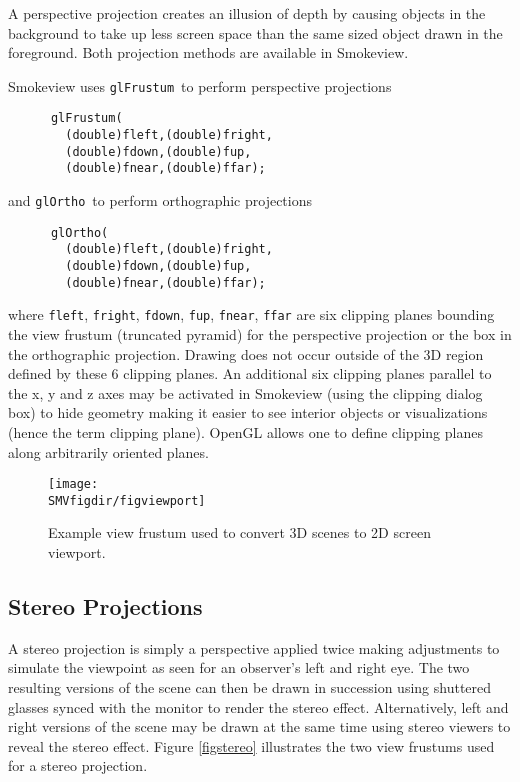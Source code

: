 \documentclass[11pt,twoside]{book}
\begin{document}
A perspective projection creates an illusion of depth by causing
objects in the background to take up less screen space than the
same sized object drawn in the foreground.  Both projection
methods are available in Smokeview.

Smokeview uses {\tt glFrustum}\ to perform perspective projections
\begin{lstlisting}
      glFrustum(
        (double)fleft,(double)fright,
        (double)fdown,(double)fup,
        (double)fnear,(double)ffar);
\end{lstlisting}
and {\tt glOrtho}\ to perform orthographic projections
\begin{lstlisting}
      glOrtho(
        (double)fleft,(double)fright,
        (double)fdown,(double)fup,
        (double)fnear,(double)ffar);
\end{lstlisting}

\noindent where {\tt fleft}, {\tt fright}, {\tt fdown}, {\tt fup}, {\tt fnear},
{\tt ffar} are six clipping planes bounding the view frustum (truncated pyramid)
for the perspective projection or the box in the orthographic projection.
Drawing does not occur outside of the 3D region defined by these 6 clipping planes.
An additional six clipping planes parallel to the x, y and z axes may be activated
in Smokeview (using the clipping dialog box) to hide geometry making it easier to
see interior objects or visualizations (hence the term clipping plane).  OpenGL
allows one to define clipping planes along arbitrarily oriented planes.
\begin{figure}[bph]
\begin{center}
\texttt{[image: \\SMVfigdir/figviewport]}
\end{center}
\caption{Example view frustum used to convert 3D scenes to 2D
screen viewport.}
 \label{figfrustum}
\end{figure}

\subsection{Stereo Projections}

A stereo projection is simply a perspective applied twice making adjustments
to simulate the viewpoint as seen for an observer's left and right eye.
The two resulting versions of the scene can then be drawn in succession
using shuttered glasses synced with the monitor to render the stereo effect.
Alternatively, left and right versions of the scene may be drawn at the same
time using stereo viewers to reveal the stereo effect.  Figure \ref{figstereo}
illustrates the two view frustums used for a stereo projection.
\end{document}
